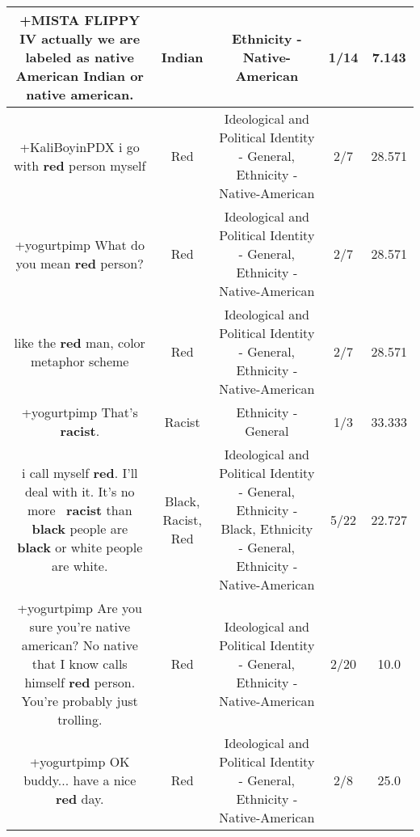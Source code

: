\documentclass[11pt]{article}
\newlength\mylength
\begin{document}
\begin{center}
\begin{longtable}{|C{.65\mylength}|C{.30\mylength}|C{.12\mylength}|C{.12\mylength}|C{.12\mylength}|}
  \small +MISTA FLIPPY IV actually we are labeled as native American \textbf{Indian} or native american.\normalsize   & Indian & Ethnicity - Native-American & 1/14 & 7.143 \\  \hline
  \small +KaliBoyinPDX i go with \textbf{r\textbf{ed}} person myself\normalsize   & Red &  Ideological and Political Identity - General, Ethnicity - Native-American & 2/7 & 28.571 \\  \hline
  \small +yogurtpimp What do you mean \textbf{r\textbf{ed}} person?\normalsize   & Red &  Ideological and Political Identity - General, Ethnicity - Native-American & 2/7 & 28.571 \\  \hline
  \small like the \textbf{r\textbf{ed}} man, color metaphor scheme\normalsize   & Red &  Ideological and Political Identity - General, Ethnicity - Native-American & 2/7 & 28.571 \\  \hline
  \small +yogurtpimp That's \textbf{racist}.\normalsize   & Racist & Ethnicity - General & 1/3 & 33.333 \\  \hline
  \small i call myself \textbf{r\textbf{ed}}. I'll deal with it. It's no more  \textbf{racist} than \textbf{black} people are \textbf{black} or white people are white.\normalsize   & Black, Racist, Red &  Ideological and Political Identity - General, Ethnicity - Black, Ethnicity - General, Ethnicity - Native-American & 5/22 & 22.727 \\  \hline
  \small +yogurtpimp Are you sure you're native american? No native that I know calls himself \textbf{r\textbf{ed}} person. You're probably just trolling.\normalsize   & Red &  Ideological and Political Identity - General, Ethnicity - Native-American & 2/20 & 10.0 \\  \hline
  \small +yogurtpimp OK buddy... have a nice \textbf{r\textbf{ed}} day.\normalsize   & Red &  Ideological and Political Identity - General, Ethnicity - Native-American & 2/8 & 25.0 \\  \hline

\end{longtable}
\end{center}
\end{document}

